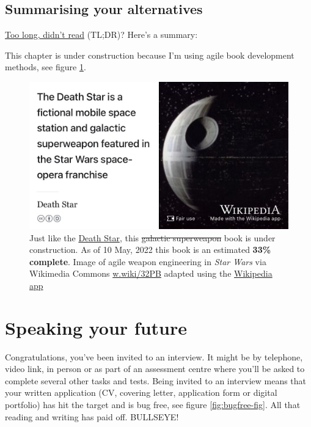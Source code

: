 \documentclass[
]{book}
\begin{document}
\hypertarget{tldr11}{%
\section{Summarising your alternatives}\label{tldr11}}

\href{https://en.wiktionary.org/wiki/too_long;_didn\%27t_read}{Too long, didn't read} (TL;DR)? Here's a summary:

This chapter is under construction because I'm using agile book development methods, see figure \ref{fig:deathstar8-fig}.

\begin{figure}

{\centering \includegraphics[width=0.99\linewidth]{images/DeathStar2} 

}

\caption{Just like the \href{https://en.wikipedia.org/wiki/Death_Star}{Death Star}, this \sout{galactic superweapon} book is under construction. As of 10 May, 2022 this book is an estimated \textbf{33\% complete}. Image of agile weapon engineering in \emph{Star Wars} via Wikimedia Commons \href{https://w.wiki/32PB}{w.wiki/32PB} adapted using the \href{https://apps.apple.com/gb/app/wikipedia/id324715238}{Wikipedia app}}\label{fig:deathstar8-fig}
\end{figure}

\hypertarget{speaking}{%
\chapter{Speaking your future}\label{speaking}}

Congratulations, you've been invited to an interview. It might be by telephone, video link, in person or as part of an assessment centre where you'll be asked to complete several other tasks and tests. Being invited to an interview means that your written application (CV, covering letter, application form or digital portfolio) has hit the target and is bug free, see figure \ref{fig:bugfree-fig}. All that reading and writing has paid off. BULLSEYE! 🎯
\end{document}
